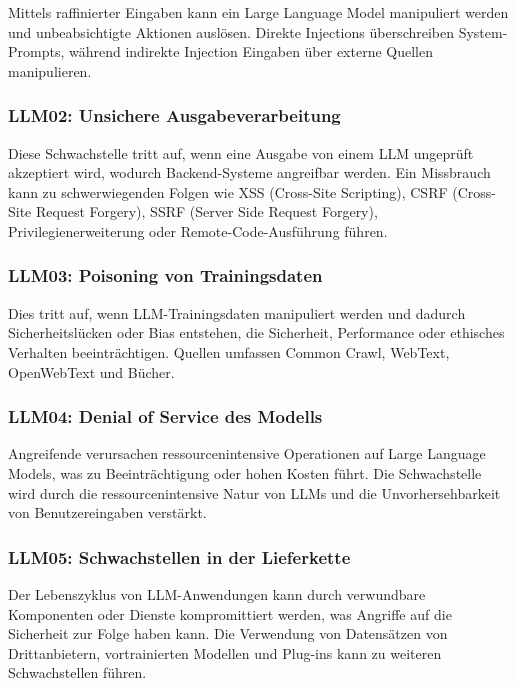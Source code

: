 \documentclass[
]{article}
\begin{document}
Mittels raffinierter Eingaben kann ein Large Language Model manipuliert
werden und unbeabsichtigte Aktionen auslösen. Direkte Injections
überschreiben System-Prompts, während indirekte Injection Eingaben über
externe Quellen manipulieren.

\subsubsection{LLM02: Unsichere
Ausgabeverarbeitung}\label{llm02-unsichere-ausgabeverarbeitung}

Diese Schwachstelle tritt auf, wenn eine Ausgabe von einem LLM ungeprüft
akzeptiert wird, wodurch Backend-Systeme angreifbar werden. Ein
Missbrauch kann zu schwerwiegenden Folgen wie XSS (Cross-Site
Scripting), CSRF (Cross-Site Request Forgery), SSRF (Server Side Request
Forgery), Privilegienerweiterung oder Remote-Code-Ausführung führen.

\subsubsection{LLM03: Poisoning von
Trainingsdaten}\label{llm03-poisoning-von-trainingsdaten}

Dies tritt auf, wenn LLM-Trainingsdaten manipuliert werden und dadurch
Sicherheitslücken oder Bias entstehen, die Sicherheit, Performance oder
ethisches Verhalten beeinträchtigen. Quellen umfassen Common Crawl,
WebText, OpenWebText und Bücher.

\subsubsection{LLM04: Denial of Service des
Modells}\label{llm04-denial-of-service-des-modells}

Angreifende verursachen ressourcenintensive Operationen auf Large
Language Models, was zu Beeinträchtigung oder hohen Kosten führt. Die
Schwachstelle wird durch die ressourcenintensive Natur von LLMs und die
Unvorhersehbarkeit von Benutzereingaben verstärkt.

\subsubsection{LLM05: Schwachstellen in der
Lieferkette}\label{llm05-schwachstellen-in-der-lieferkette}

Der Lebenszyklus von LLM-Anwendungen kann durch verwundbare Komponenten
oder Dienste kompromittiert werden, was Angriffe auf die Sicherheit zur
Folge haben kann. Die Verwendung von Datensätzen von Drittanbietern,
vortrainierten Modellen und Plug-ins kann zu weiteren Schwachstellen
führen.
\end{document}
